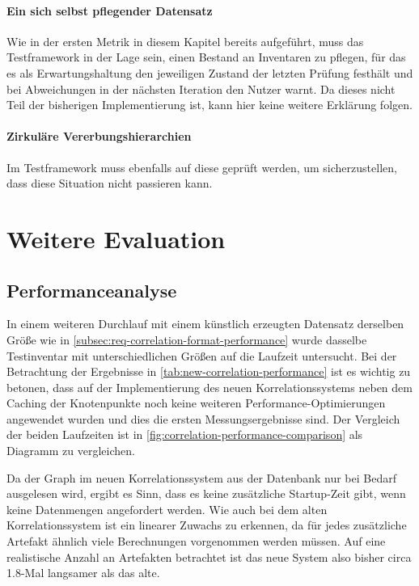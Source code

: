 \paragraph{Ein sich selbst pflegender Datensatz}
Wie in der ersten Metrik in diesem Kapitel bereits aufgeführt, muss das Testframework in der Lage sein, einen Bestand an Inventaren zu pflegen, für das es als Erwartungshaltung den jeweiligen Zustand der letzten Prüfung festhält und bei Abweichungen in der nächsten Iteration den Nutzer warnt.
Da dieses nicht Teil der bisherigen Implementierung ist, kann hier keine weitere Erklärung folgen.

\paragraph{Zirkuläre Vererbungshierarchien}
Im Testframework muss ebenfalls auf diese geprüft werden, um sicherzustellen, dass diese Situation nicht passieren kann.


\section{Weitere Evaluation}

\subsection{Performanceanalyse}\label{subsec:evaluation-performanceanalyse}

In einem weiteren Durchlauf mit einem künstlich erzeugten Datensatz derselben Größe wie in \autoref{subsec:req-correlation-format-performance} wurde dasselbe Testinventar mit unterschiedlichen Größen auf die Laufzeit untersucht.
Bei der Betrachtung der Ergebnisse in \autoref{tab:new-correlation-performance} ist es wichtig zu betonen, dass auf der Implementierung des neuen Korrelationssystems neben dem Caching der Knotenpunkte noch keine weiteren Performance-Optimierungen angewendet wurden und dies die ersten Messungsergebnisse sind.
Der Vergleich der beiden Laufzeiten ist in \autoref{fig:correlation-performance-comparison} als Diagramm zu vergleichen.

Da der Graph im neuen Korrelationssystem aus der Datenbank nur bei Bedarf ausgelesen wird, ergibt es Sinn, dass es keine zusätzliche Startup-Zeit gibt, wenn keine Datenmengen angefordert werden.
Wie auch bei dem alten Korrelationssystem ist ein linearer Zuwachs zu erkennen, da für jedes zusätzliche Artefakt ähnlich viele Berechnungen vorgenommen werden müssen.
Auf eine realistische Anzahl an Artefakten betrachtet ist das neue System also bisher circa 1.8-Mal langsamer als das alte.

